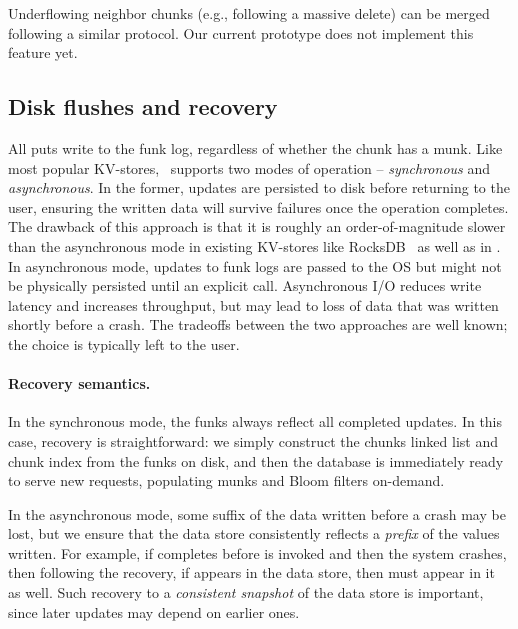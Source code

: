 Underflowing neighbor chunks (e.g., following a massive delete) can be merged following a similar protocol. 
Our current \sys\/ prototype does not implement this feature yet. 

\subsection{Disk flushes and recovery}
\label{ssec:flush-recovery}

All puts write to the funk log, regardless of whether the chunk has a munk. Like most popular KV-stores, \sys\ supports 
two modes of operation -- \emph{synchronous} and \emph{asynchronous}. In the former,  updates are persisted to disk 
before returning to the user, ensuring the written data will survive failures once the operation completes. 
The drawback of this approach is that it is roughly an order-of-magnitude slower than the asynchronous mode in existing KV-stores 
like RocksDB~\cite{RocksDB} as well as in \sys. In asynchronous mode, updates to funk logs are passed to the OS but might 
not be physically persisted until an explicit  call.  Asynchronous I/O reduces write latency and increases throughput, but 
may lead to loss of data that was written shortly before a crash. The tradeoffs between the two approaches are 
well known; the choice is typically left to the user.

\paragraph{Recovery semantics.}
In the synchronous mode, 
the funks always reflect all completed updates. In this case, recovery is straightforward: we simply construct
the chunks linked list and chunk index from the funks on disk, and then the database is immediately ready to serve new requests, populating munks and Bloom filters on-demand.  

In the asynchronous mode, some suffix of the  data written before a crash may be lost, but we  
ensure that the data store consistently reflects a \emph{prefix} of the  values written.
For example, if  completes before  
is invoked and then the system crashes, then following the recovery, 
if  appears in the data store, then  must appear in it as well. 
Such recovery to a \emph{consistent snapshot} of the data store is important, since later updates may depend on earlier ones. 

